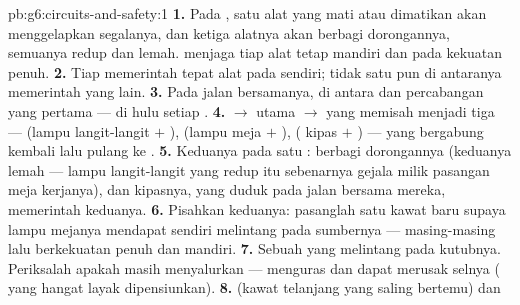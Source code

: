 \begin{solution}{pb:g6:circuits-and-safety:1}
\textbf{1.} Pada , satu alat yang mati atau dimatikan
akan menggelapkan segalanya, dan ketiga alatnya akan berbagi
dorongannya, semuanya redup dan lemah.  menjaga tiap
alat tetap mandiri dan pada kekuatan penuh.
\textbf{2.} Tiap  memerintah tepat alat pada  sendiri;
tidak satu pun di antaranya memerintah  yang lain.
\textbf{3.} Pada jalan bersamanya, di antara  dan
percabangan yang pertama --- di hulu setiap .
\textbf{4.}  $\to$  utama $\to$  yang
memisah menjadi tiga  --- (lampu langit-langit $+$ ),
(lampu meja $+$ ), ( kipas $+$ ) --- yang
bergabung kembali lalu pulang ke .
\textbf{5.} Keduanya  pada satu : berbagi
dorongannya (keduanya lemah --- lampu langit-langit yang redup itu
sebenarnya gejala milik pasangan meja kerjanya), dan  kipasnya,
yang duduk pada jalan bersama mereka, memerintah keduanya.
\textbf{6.} Pisahkan keduanya: pasanglah satu kawat baru supaya lampu
mejanya mendapat  sendiri melintang pada sumbernya ---
masing-masing lalu berkekuatan penuh dan mandiri.
\textbf{7.} Sebuah  yang melintang pada kutubnya.
Periksalah apakah  masih menyalurkan --- 
menguras dan dapat merusak selnya ( yang hangat layak
dipensiunkan).
\textbf{8.}  (kawat telanjang yang saling bertemu) dan

\end{solution}
